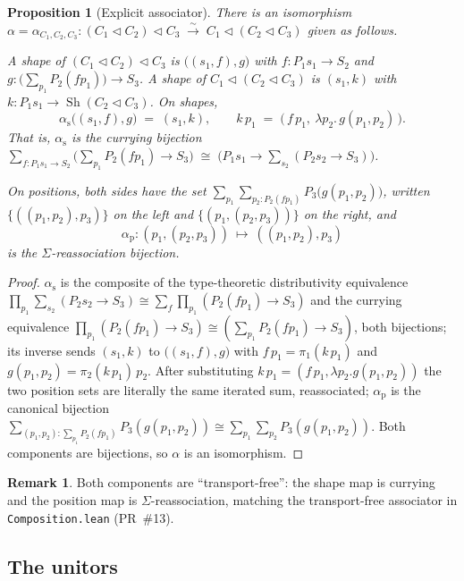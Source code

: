 \documentclass[11pt]{article}
\newtheorem{proposition}{Proposition}
\theoremstyle{definition}
\newtheorem{remark}{Remark}
\newcommand{\tri}{\mathbin{\triangleleft}}
\DeclareMathOperator{\Sh}{Sh}
\begin{document}
\begin{proposition}[Explicit associator]\label{prop:assoc}
There is an isomorphism
$\alpha=\alpha_{C_1,C_2,C_3}\colon (C_1\tri C_2)\tri C_3\;\xrightarrow{\sim}\;
C_1\tri(C_2\tri C_3)$ given as follows.

A shape of $(C_1\tri C_2)\tri C_3$ is $\bigl((s_1,f),g\bigr)$ with
$f\colon P_1 s_1\to S_2$ and
$g\colon\bigl(\sum_{p_1}P_2(f p_1)\bigr)\to S_3$.
A shape of $C_1\tri(C_2\tri C_3)$ is $(s_1,k)$ with
$k\colon P_1 s_1\to \Sh(C_2\tri C_3)$.
On shapes,
\[
  \alpha_{\mathrm s}\bigl((s_1,f),g\bigr)\;=\;(s_1,k),
  \qquad k\,p_1 \;=\; \bigl(\,f\,p_1,\ \lambda p_2.\,g(p_1,p_2)\,\bigr).
\]
That is, $\alpha_{\mathrm s}$ is the \emph{currying} bijection
$\sum_{f:P_1 s_1\to S_2}\bigl(\textstyle\sum_{p_1}P_2(f p_1)\to S_3\bigr)\;\cong\;
\bigl(P_1 s_1\to\sum_{s_2}(P_2 s_2\to S_3)\bigr)$.

On positions, both sides have the set
$\sum_{p_1}\sum_{p_2:P_2(f p_1)}P_3\bigl(g(p_1,p_2)\bigr)$, written
$\{((p_1,p_2),p_3)\}$ on the left and $\{(p_1,(p_2,p_3))\}$ on the right, and
\[
  \alpha_{\mathrm p}\colon (p_1,(p_2,p_3))\ \longmapsto\ ((p_1,p_2),p_3)
\]
is the $\Sigma$-reassociation bijection.
\end{proposition}

\begin{proof}
$\alpha_{\mathrm s}$ is the composite of the type-theoretic distributivity
equivalence
$\prod_{p_1}\sum_{s_2}(P_2 s_2\to S_3)\cong
\sum_{f}\prod_{p_1}(P_2(f p_1)\to S_3)$ and the currying equivalence
$\prod_{p_1}(P_2(f p_1)\to S_3)\cong(\sum_{p_1}P_2(f p_1)\to S_3)$, both
bijections; its inverse sends $(s_1,k)$ to $\bigl((s_1,f),g\bigr)$ with
$f\,p_1=\pi_1(k\,p_1)$ and $g(p_1,p_2)=\pi_2(k\,p_1)\,p_2$.
After substituting $k\,p_1=(f\,p_1,\lambda p_2.g(p_1,p_2))$ the two position
sets are literally the same iterated sum, reassociated; $\alpha_{\mathrm p}$ is
the canonical bijection
$\sum_{(p_1,p_2):\sum_{p_1}P_2(f p_1)}P_3(g(p_1,p_2))\cong
\sum_{p_1}\sum_{p_2}P_3(g(p_1,p_2))$. Both components are bijections, so
$\alpha$ is an isomorphism.
\end{proof}

\begin{remark}
Both components are ``transport-free'': the shape map is currying and the
position map is $\Sigma$-reassociation, matching the transport-free associator
in \texttt{Composition.lean} (PR~\#13).
\end{remark}

\subsection{The unitors}\label{sec:unitors}
\end{document}
